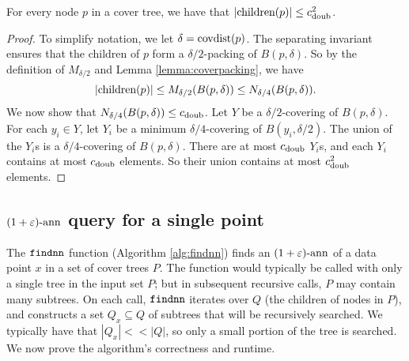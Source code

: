 \documentclass[../main.tex]{subfiles}
\newcommand{\cdoub}{c_\textnormal{doub}}
\newcommand{\p}{\ensuremath p}
\newcommand{\mkfunction}[1]{\ifmmode{\textnormal{{#1}}}}
\newcommand{\children}[1]   {\mkfunction{children}({#1})}
\newcommand{\covdist}[1]    {\mkfunction{covdist}({#1})}
\newcommand{\mkprocedure}[1]{\textnormal{\ttfamily {#1}}}
\newcommand{\findnn}{\mkprocedure{findnn}}
\begin{document}

\begin{lemma}
    \label{lemma:children}
    For every node $p$ in a cover tree, we have that
    $|\children\p| \le \cdoub^2$.
\end{lemma}

\begin{proof}
    To simplify notation, we let $\delta=\covdist{p}$.
    The separating invariant ensures that the children of $p$ form a $\delta/2$-packing of $B(p,\delta)$.
    So by the definition of $M_{\delta/2}$ and Lemma \ref{lemma:coverpacking}, we have
    \begin{equation}
        |\children{p}| 
        \le M_{\delta/2}(B(p,\delta)) 
        \le N_{\delta/4}(B(p,\delta)) 
        .
    \end{equation}
    We now show that $N_{\delta/4}(B(p,\delta))\le\cdoub$.
    Let $Y$ be a $\delta/2$-covering of $B(p,\delta)$.
    For each $y_i\in Y$, let $Y_i$ be a minimum $\delta/4$-covering of $B(y_i,\delta/2)$.
    The union of the $Y_i$s is a $\delta/4$-covering of $B(p,\delta)$.
    There are at most $\cdoub$ $Y_i$s, and each $Y_i$ contains at most $\cdoub$ elements.
    So their union contains at most $\cdoub^2$ elements.
\end{proof}

\subsection{$(1+\varepsilon)\text{-ann}$ query for a single point}

The $\findnn$ function (Algorithm \ref{alg:findnn}) finds an $(1+\varepsilon)\text{-ann}$ of a data point $x$ in a set of cover trees $P$.
The function would typically be called with only a single tree in the input set $P$;
but in subsequent recursive calls, $P$ may contain many subtrees. 
On each call,
$\findnn$ iterates over $Q$ (the children of nodes in $P$),
and constructs a set $Q_x \subseteq Q$ of subtrees that will be recursively searched.
We typically have that $|Q_x| <\!\!< |Q|$,
so only a small portion of the tree is searched.
We now prove the algorithm's correctness and runtime.
\end{document}
